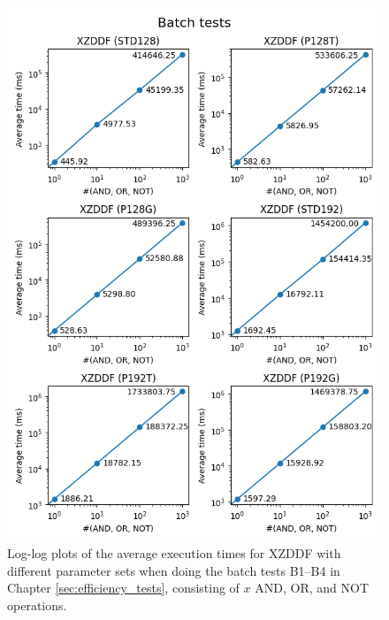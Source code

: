 \begin{figure}[ht]
    \centering
    \includegraphics[width=\textwidth]{data/figures/batch_2.png}
    \caption{Log-log plots of the average execution times for XZDDF with different parameter sets when doing the batch tests B1--B4 in Chapter \ref{sec:efficiency_tests}, consisting of $x$ AND, OR, and NOT operations.}
    \label{fig:batch2}
\end{figure}



\iffalse

